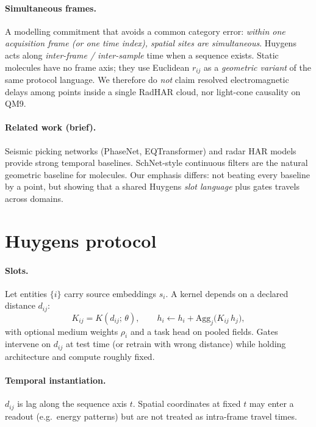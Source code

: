 \documentclass[twocolumn,10pt]{article}
\begin{document}
\paragraph{Simultaneous frames.}
A modelling commitment that avoids a common category error:
\emph{within one acquisition frame (or one time index), spatial sites are
simultaneous}.
Huygens acts along \emph{inter-frame / inter-sample} time when a sequence
exists.
Static molecules have no frame axis; they use Euclidean $r_{ij}$ as a
\emph{geometric variant} of the same protocol language.
We therefore do \emph{not} claim resolved electromagnetic delays among points
inside a single RadHAR cloud, nor light-cone causality on QM9.

\paragraph{Related work (brief).}
Seismic picking networks (PhaseNet, EQTransformer)\cite{zhu2019phasenet,mousavi2020eqtransformer}
and radar HAR models provide strong temporal baselines.
SchNet-style continuous filters\cite{schutt2018schnet} are the natural geometric
baseline for molecules.
Our emphasis differs: not beating every baseline by a point, but showing that a
shared Huygens \emph{slot language} plus gates travels across domains.

\section*{Huygens protocol}
\label{sec:protocol}
\paragraph{Slots.}
Let entities $\{i\}$ carry source embeddings $s_i$.
A kernel depends on a declared distance $d_{ij}$:
\begin{equation}
K_{ij}=K(d_{ij};\,\theta),\qquad
h_i \leftarrow h_i + \mathrm{Agg}_j\!\big(K_{ij}\,h_j\big),
\end{equation}
with optional medium weights $\rho_i$ and a task head on pooled fields.
Gates intervene on $d_{ij}$ at test time (or retrain with wrong distance) while
holding architecture and compute roughly fixed.

\paragraph{Temporal instantiation.}
$d_{ij}$ is lag along the sequence axis $t$.
Spatial coordinates at fixed $t$ may enter a readout (e.g.\ energy patterns) but
are not treated as intra-frame travel times.
\end{document}
